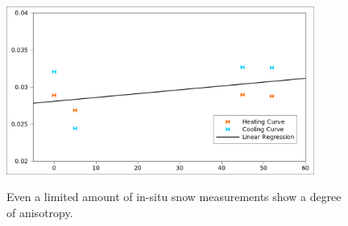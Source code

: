 \begin{figure}[h]
\centering
\includegraphics[width=0.9\textwidth]{fig/snow_meas.png}
\label{fig:test_results}
\caption{Even a limited amount of in-situ snow measurements show a degree of
anisotropy.}
\end{figure}

